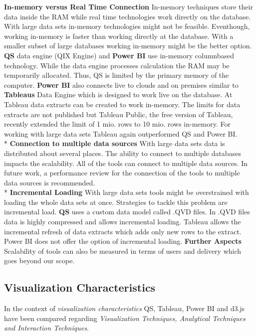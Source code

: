 \textbf{In-memory versus Real Time Connection}
In-memory techniques store their data inside the RAM while real time technologies work directly on the database.
With large data sets in-memory technologies might not be feasible. Eventhough, working in-memory is faster than working directly at the database. With a smaller subset of large databases working in-memory might be the better option. 
\textbf{QS} data engine (QIX Engine) and \textbf{Power BI} use in-memory columnbased technology. While the data engine processes calculation the RAM may be temporarily allocated. Thus, QS is limited by the primary memory of the computer. \textbf{Power BI} also connects live to clouds and on premises similar to \textbf{Tableaus} Data Engine which is designed to work live on the database. At Tableau data extracts can be created to work in-memory. The limits for data extracts are not published but Tableau Public, the free version of Tableau, recently extended the limit of 1 mio. rows to 10 mio. rows in-memory. 
For working with large data sets Tableau again outperformed QS and Power BI.\\*
\textbf{Connection to multiple data sources}
With large data sets data is distributed about several places. The ability to connect to multiple databases impacts the scalability. All of the tools can connect to multiple data sources. In future work, a performance review for the connection of the tools to multiple data sources is recommended.\\*
\textbf{Incremental Loading}
With large data sets tools might be overstrained with loading the whole data sets at once. Strategies to tackle this problem are incremental load. \textbf{QS} uses a custom data model called .QVD files. In .QVD files data is highly compressed and allows incremental loading. Tableau allows the incremental refresh of data extracts which adds only new rows to the extract. Power BI does not offer the option of incremental loading. 
\textbf{Further Aspects}
Scalability of tools can also be measured in terms of users and delivery which goes beyond our scope.




\subsection{Visualization Characteristics}
In the context of \textit{visualization characteristics} QS, Tableau, Power BI and d3.js have been compared regarding \textit{Visualization Techniques, Analytical Techniques and Interaction Techniques}. 

